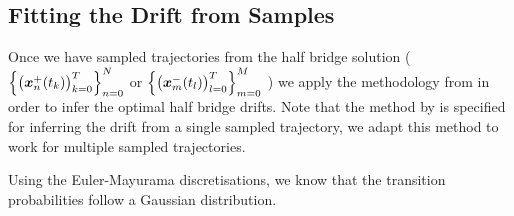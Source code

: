 \documentclass[a4paper,12pt,twoside,openright]{report}
\theoremstyle{definition}
\begin{document}
\subsection{Fitting the Drift from Samples}

Once we have sampled trajectories from the half bridge solution ($\left\{ \big({\bm{x}}^{+}_n(t_k) \big)_{k=0}^T \right\}_{n=0}^{N}$ or  $\left\{\big({\bm{x}}^{-}_m(t_l)\big)_{l=0}^T\right\}_{m=0}^{M}$ ) we  apply the methodology from \citep{ruttor2013approximate, batz2018approximate} in order to infer the optimal half bridge drifts. Note that the method by \cite{ruttor2013approximate} is specified for inferring the drift from a single sampled trajectory, we adapt this method to work for multiple sampled trajectories.

Using the Euler-Mayurama discretisations, we know that the transition probabilities follow a Gaussian distribution.
\end{document}

